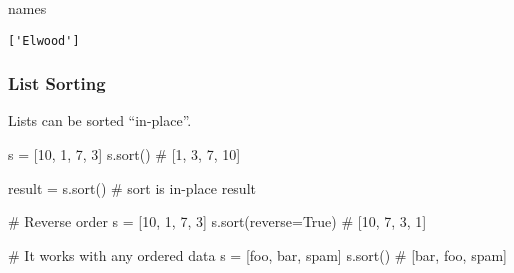 \documentclass[
  letterpaper,
  DIV=11,
  numbers=noendperiod]{scrreprt}
\newenvironment{Shaded}{\begin{snugshade}}{\end{snugshade}}
\newcommand{\CommentTok}[1]{\textcolor[rgb]{0.37,0.37,0.37}{#1}}
\newcommand{\DecValTok}[1]{\textcolor[rgb]{0.68,0.00,0.00}{#1}}
\newcommand{\NormalTok}[1]{\textcolor[rgb]{0.00,0.46,0.62}{#1}}
\newcommand{\OperatorTok}[1]{\textcolor[rgb]{0.37,0.37,0.37}{#1}}
\newcommand{\NormalTok}[1]{\textcolor[rgb]{0.00,0.48,0.65}{#1}}
\newcommand{\OperatorTok}[1]{\textcolor[rgb]{0.37,0.37,0.37}{#1}}
\newcommand{\StringTok}[1]{\textcolor[rgb]{0.13,0.47,0.30}{#1}}
\newcommand{\VariableTok}[1]{\textcolor[rgb]{0.07,0.07,0.07}{#1}}
\begin{document}
\begin{Shaded}
\begin{Highlighting}[]
\begin{Shaded}
\begin{Highlighting}[]
\NormalTok{names}
\end{Highlighting}
\end{Shaded}

\begin{verbatim}
['Elwood']
\end{verbatim}

\hypertarget{list-sorting}{%
\subsubsection{List Sorting}\label{list-sorting}}

Lists can be sorted ``in-place''.

\begin{Shaded}
\begin{Highlighting}[]
\NormalTok{s }\OperatorTok{=}\NormalTok{ [}\DecValTok{10}\NormalTok{, }\DecValTok{1}\NormalTok{, }\DecValTok{7}\NormalTok{, }\DecValTok{3}\NormalTok{]}
\NormalTok{s.sort()                    }\CommentTok{\# [1, 3, 7, 10]}
\end{Highlighting}
\end{Shaded}

\begin{Shaded}
\begin{Highlighting}[]
\NormalTok{result }\OperatorTok{=}\NormalTok{ s.sort()     }\CommentTok{\# sort is in{-}place}
\NormalTok{result}
\end{Highlighting}
\end{Shaded}

\begin{Shaded}
\begin{Highlighting}[]
\CommentTok{\# Reverse order}
\NormalTok{s }\OperatorTok{=}\NormalTok{ [}\DecValTok{10}\NormalTok{, }\DecValTok{1}\NormalTok{, }\DecValTok{7}\NormalTok{, }\DecValTok{3}\NormalTok{]}
\NormalTok{s.sort(reverse}\OperatorTok{=}\VariableTok{True}\NormalTok{)        }\CommentTok{\# [10, 7, 3, 1]}
\end{Highlighting}
\end{Shaded}

\begin{Shaded}
\begin{Highlighting}[]
\CommentTok{\# It works with any ordered data}
\NormalTok{s }\OperatorTok{=}\NormalTok{ [}\StringTok{\textquotesingle{}foo\textquotesingle{}}\NormalTok{, }\StringTok{\textquotesingle{}bar\textquotesingle{}}\NormalTok{, }\StringTok{\textquotesingle{}spam\textquotesingle{}}\NormalTok{]}
\NormalTok{s.sort()                    }\CommentTok{\# [\textquotesingle{}bar\textquotesingle{}, \textquotesingle{}foo\textquotesingle{}, \textquotesingle{}spam\textquotesingle{}]}
\end{Highlighting}
\end{Shaded}


\end{Highlighting}
\end{Shaded}
\end{document}
